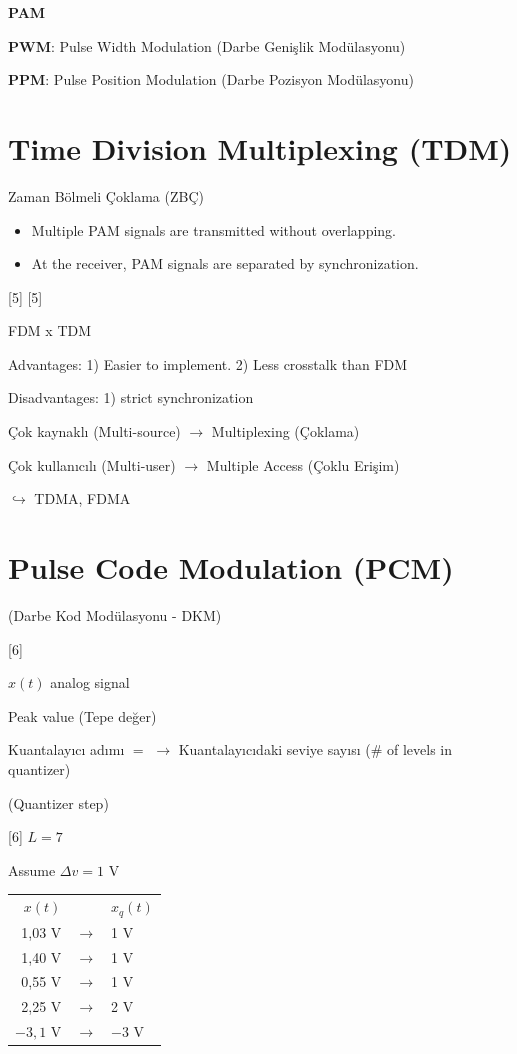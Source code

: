 \documentclass[11pt,a4paper]{article}
\begin{document}
\textbf{PAM}

\textbf{PWM}: Pulse Width Modulation (Darbe Genişlik Modülasyonu)

\textbf{PPM}: Pulse Position Modulation (Darbe Pozisyon Modülasyonu)

\section{Time Division Multiplexing (TDM)}
Zaman Bölmeli Çoklama (ZBÇ)
\begin{itemize}
\item Multiple PAM signals are transmitted without overlapping.
\item At the receiver, PAM signals are separated by synchronization.
\end{itemize}
[5]
[5]

FDM x TDM

Advantages: 1) Easier to implement. 2) Less crosstalk than FDM

Disadvantages: 1) strict synchronization

Çok kaynaklı (Multi-source) $\longrightarrow$ Multiplexing (Çoklama)

Çok kullanıcılı (Multi-user) $\longrightarrow$ Multiple Access (Çoklu Erişim)

$\hookrightarrow$ TDMA, FDMA

\section{Pulse Code Modulation (PCM)}
(Darbe Kod Modülasyonu - DKM)

[6]

$x(t)$ analog signal

 \quad Peak value (Tepe değer)

Kuantalayıcı adımı $=$  $\longrightarrow$ Kuantalayıcıdaki seviye sayısı (\# of levels in quantizer)

(Quantizer step)

[6]
$L=7$

Assume $\Delta v=1$ V
\begin{center}
\begin{tabular}{rcl}
$x(t)$ & & $x_q(t)$\\
1,03 V & $\longrightarrow$ & 1 V\\
1,40 V & $\longrightarrow$ & 1 V\\
0,55 V & $\longrightarrow$ & 1 V\\
2,25 V & $\longrightarrow$ & 2 V\\
$-3{,}1$ V & $\longrightarrow$ & $-3$ V
\end{tabular}
\end{center}
\end{document}
